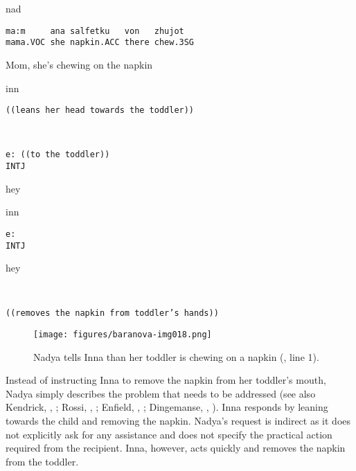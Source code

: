\documentclass[output=paper,modfonts,nonflat]{langsci/langscibook}
\begin{document}
\vspace{-1mm}
%
\begin{mdframednoverticalspace}[style=firstfoc]
\begin{transbox}{1}{nad}
\begin{verbatim}
ma:m     ana salfetku   von   zhujot
mama.VOC she napkin.ACC there chew.3SG
\end{verbatim}
Mom, she's chewing on the napkin
\end{transbox}
\end{mdframednoverticalspace}
%
\begin{transbox}{2}{inn}
\begin{verbatim}
((leans her head towards the toddler))
\end{verbatim}
\end{transbox}
%
\begin{transbox}{3}{~}
\begin{verbatim}
e: ((to the toddler)) 
INTJ
\end{verbatim}
hey
\end{transbox}
%
%
\begin{transbox}{5}{inn}
\begin{verbatim}
e:
INTJ
\end{verbatim}
hey
\end{transbox}
%
\begin{transbox}{6}{~}
\begin{verbatim}
((removes the napkin from toddler’s hands))
\end{verbatim}
\end{transbox}\bigskip

\begin{figure}
\texttt{[image: figures/baranova-img018.png]}
\caption{Nadya tells Inna than her toddler is chewing on a napkin (, line 1).}
\label{fig:baranova:18}
\end{figure}

Instead of instructing Inna to remove the napkin from her toddler's mouth, Nadya simply describes the problem that needs to be addressed (see also Kendrick, , ; Rossi, , ; Enfield, , ; Dingemanse, , ). Inna responds by leaning towards the child and removing the napkin. Nadya’s request is indirect as it does not explicitly ask for any assistance and does not specify the practical action required from the recipient. Inna, however, acts quickly and removes the napkin from the toddler. 
\end{document}
